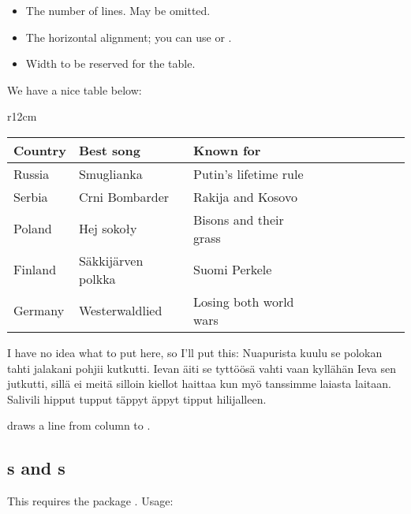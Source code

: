 \begin{itemize}
\item {} The number of lines. May be omitted.
\item {} The horizontal alignment; you can use  or .
\item {} Width to be reserved for the table.
\end{itemize}

\begin{examplef}
We have a nice table below:

\begin{wraptable}[9]{r}{12cm}
\vspace{-11pt}
\hspace{20pt}
\begin{tabular}[c]{|l|| *9{l|} }\hline
  Country & Best song & Known for \\\hline\hline
  Russia & Smuglianka & Putin's lifetime rule \\\hline
  Serbia & Crni Bombarder & Rakija and Kosovo \\\hline
  Poland & Hej soko\l{}y & Bisons and their grass \\\hline
  Finland & S\"akkij\"arven polkka & Suomi Perkele \\\hline
  Germany & Westerwaldlied & Losing both world wars \\\hline
\end{tabular}
\hspace{5pt}
\end{wraptable}
I have no idea what to put here, so I'll put this:
Nuapurista kuulu se polokan tahti jalakani pohjii kutkutti.
Ievan \"aiti se tytt\"o\"os\"a vahti vaan kyll\"ah\"an Ieva sen jutkutti,
sill\"a ei meit\"a silloin kiellot haittaa kun my\"o tanssimme laiasta laitaan.
Salivili hipput tupput t\"appyt \"appyt tipput hilijalleen.
\end{examplef}



 draws a line from column  to .

\subsection{s and s}
This requires the package .
Usage:\
\begin{latex}
\end{latex}

